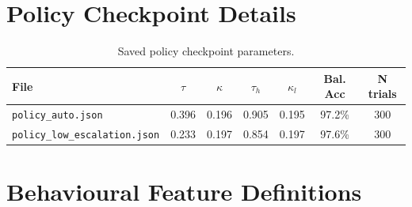 \documentclass[12pt,a4paper]{article}
\begin{document}
\appendix
\section{Policy Checkpoint Details}
\label{app:policy}

\begin{table}[H]
\centering
\caption{Saved policy checkpoint parameters.}
\begin{tabular}{lcccccc}
\toprule
\textbf{File} & $\tau$ & $\kappa$ & $\tau_h$ & $\kappa_l$
              & \textbf{Bal. Acc} & \textbf{N trials} \\
\midrule
\texttt{policy\_auto.json}            & 0.396 & 0.196 & 0.905 & 0.195 & 97.2\% & 300 \\
\texttt{policy\_low\_escalation.json} & 0.233 & 0.197 & 0.854 & 0.197 & 97.6\% & 300 \\
\bottomrule
\end{tabular}
\end{table}

\section{Behavioural Feature Definitions}
\label{app:features}
\end{document}
